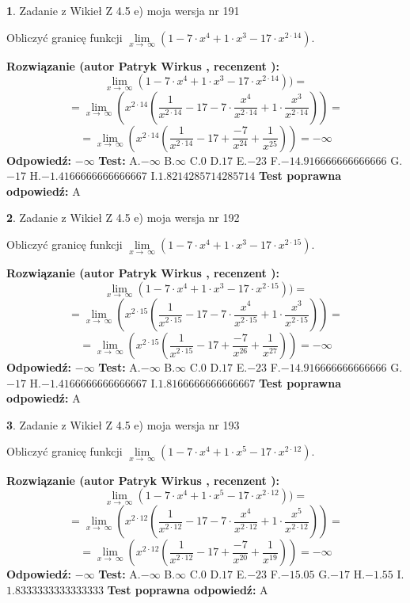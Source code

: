 \documentclass[12pt, a4paper]{article}
\theoremstyle{definition} %
\newtheorem{zad}{}
\newcommand{\zadStart}[1]{\begin{zad}#1\newline}
\newcommand{\zadStop}{\end{zad}}
\newcommand{\rozwStart}[2]{\noindent \textbf{Rozwiązanie (autor #1 , recenzent #2): }\newline}
\newcommand{\rozwStop}{\newline}
\newcommand{\odpStart}{\noindent \textbf{Odpowiedź:}\newline}
\newcommand{\odpStop}{\newline}
\newcommand{\testStart}{\noindent \textbf{Test:}\newline}
\newcommand{\testStop}{\newline}
\newcommand{\kluczStart}{\noindent \textbf{Test poprawna odpowiedź:}\newline}
\newcommand{\kluczStop}{\newline}
\begin{document}
\zadStart{Zadanie z Wikieł Z 4.5 e) moja wersja nr 191}


Obliczyć granicę funkcji  $\lim\limits_{x\to\ \infty}(1 - 7 \cdot x^{4}+1 \cdot x^{3}- 17 \cdot x^{2\cdot14})$.
\zadStop
\rozwStart{Patryk Wirkus}{}
$$\lim\limits_{x\to\ \infty}(1 - 7 \cdot x^{4}+1 \cdot x^{3}- 17 \cdot x^{2\cdot14}))=$$
$$=\lim\limits_{x\to\ \infty}(x^{2\cdot14}(\frac{1}{x^{2\cdot14}}-17 -7 \cdot \frac{x^{4}}{x^{2\cdot14}}+1 \cdot \frac{x^{3}}{x^{2\cdot14}}))=$$
$$=\lim\limits_{x\to\ \infty}(x^{2\cdot14}(\frac{1}{x^{2\cdot14}}-17 + \frac{-7}{x^{24}}+ \frac{1}{x^{25}}))=-\infty$$
\rozwStop
\odpStart
$-\infty$
\odpStop
\testStart
A.$-\infty$ B.$\infty$ C.$0$ D.$17$ E.$-23$
F.$-14.916666666666666$ G.$-17$
H.$-1.4166666666666667$
I.$1.8214285714285714$
\testStop
\kluczStart
A
\kluczStop



\zadStart{Zadanie z Wikieł Z 4.5 e) moja wersja nr 192}


Obliczyć granicę funkcji  $\lim\limits_{x\to\ \infty}(1 - 7 \cdot x^{4}+1 \cdot x^{3}- 17 \cdot x^{2\cdot15})$.
\zadStop
\rozwStart{Patryk Wirkus}{}
$$\lim\limits_{x\to\ \infty}(1 - 7 \cdot x^{4}+1 \cdot x^{3}- 17 \cdot x^{2\cdot15}))=$$
$$=\lim\limits_{x\to\ \infty}(x^{2\cdot15}(\frac{1}{x^{2\cdot15}}-17 -7 \cdot \frac{x^{4}}{x^{2\cdot15}}+1 \cdot \frac{x^{3}}{x^{2\cdot15}}))=$$
$$=\lim\limits_{x\to\ \infty}(x^{2\cdot15}(\frac{1}{x^{2\cdot15}}-17 + \frac{-7}{x^{26}}+ \frac{1}{x^{27}}))=-\infty$$
\rozwStop
\odpStart
$-\infty$
\odpStop
\testStart
A.$-\infty$ B.$\infty$ C.$0$ D.$17$ E.$-23$
F.$-14.916666666666666$ G.$-17$
H.$-1.4166666666666667$
I.$1.8166666666666667$
\testStop
\kluczStart
A
\kluczStop



\zadStart{Zadanie z Wikieł Z 4.5 e) moja wersja nr 193}


Obliczyć granicę funkcji  $\lim\limits_{x\to\ \infty}(1 - 7 \cdot x^{4}+1 \cdot x^{5}- 17 \cdot x^{2\cdot12})$.
\zadStop
\rozwStart{Patryk Wirkus}{}
$$\lim\limits_{x\to\ \infty}(1 - 7 \cdot x^{4}+1 \cdot x^{5}- 17 \cdot x^{2\cdot12}))=$$
$$=\lim\limits_{x\to\ \infty}(x^{2\cdot12}(\frac{1}{x^{2\cdot12}}-17 -7 \cdot \frac{x^{4}}{x^{2\cdot12}}+1 \cdot \frac{x^{5}}{x^{2\cdot12}}))=$$
$$=\lim\limits_{x\to\ \infty}(x^{2\cdot12}(\frac{1}{x^{2\cdot12}}-17 + \frac{-7}{x^{20}}+ \frac{1}{x^{19}}))=-\infty$$
\rozwStop
\odpStart
$-\infty$
\odpStop
\testStart
A.$-\infty$ B.$\infty$ C.$0$ D.$17$ E.$-23$
F.$-15.05$ G.$-17$
H.$-1.55$
I.$1.8333333333333333$
\testStop
\kluczStart
A
\kluczStop
\end{document}

